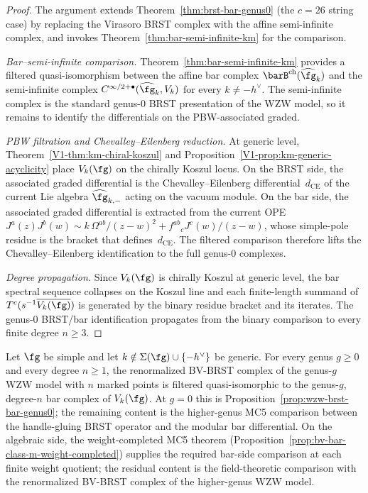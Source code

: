 \begin{proof}
The argument extends
Theorem~\ref{thm:brst-bar-genus0} \textup{(}the $c = 26$ string
case\textup{)} by replacing the Virasoro BRST complex with the
affine semi-infinite complex, and invokes
Theorem~\ref{thm:bar-semi-infinite-km} for the comparison.

\emph{Bar--semi-infinite comparison.}
Theorem~\ref{thm:bar-semi-infinite-km} provides a filtered
quasi-isomorphism between the affine bar complex
$\barB^{\mathrm{ch}}(\widehat{\fg}_k)$ and the semi-infinite complex
$C^{\infty/2+\bullet}(\widehat{\fg}_k, V_k)$ for every
$k \neq -h^\vee$. The semi-infinite complex is the standard
genus-$0$ BRST presentation of the WZW model, so it remains to
identify the differentials on the PBW-associated graded.

\emph{PBW filtration and Chevalley--Eilenberg reduction.}
At generic level, Theorem~\ref{V1-thm:km-chiral-koszul} and
Proposition~\ref{V1-prop:km-generic-acyclicity} place $V_k(\fg)$ on the
chirally Koszul locus. On the BRST side, the associated graded
differential is the Chevalley--Eilenberg differential~$d_{\mathrm{CE}}$
of the current Lie algebra $\widehat{\fg}_{k,-}$ acting on the
vacuum module. On the bar side, the associated graded differential
is extracted from the current OPE
$J^a(z) J^b(w) \sim k\,\Omega^{ab}/(z-w)^2 + f^{ab}{}_c J^c(w)/(z-w)$,
whose simple-pole residue is the bracket that defines~$d_{\mathrm{CE}}$.
The filtered comparison therefore lifts the Chevalley--Eilenberg
identification to the full genus-$0$ complexes.

\emph{Degree propagation.}
Since $V_k(\fg)$ is chirally Koszul at generic level, the bar spectral
sequence collapses on the Koszul line and each finite-length summand of
$T^c(s^{-1}\overline{V_k(\fg)})$ is generated by the binary residue
bracket and its iterates. The genus-$0$ BRST/bar identification
propagates from the binary comparison to every finite degree $n \geq 3$.
\end{proof}

\begin{conjecture}
\label{conj:wzw-brst-bar-all-genera}
Let $\fg$ be simple and let
$k \notin \Sigma(\fg) \cup \{-h^\vee\}$ be generic. For every
genus $g \geq 0$ and every degree $n \geq 1$, the renormalized
BV-BRST complex of the genus-$g$ WZW model with $n$ marked points is
filtered quasi-isomorphic to the genus-$g$, degree-$n$ bar complex of
$V_k(\fg)$. At $g=0$ this is
Proposition~\ref{prop:wzw-brst-bar-genus0}; the remaining content is
the higher-genus MC5 comparison between the handle-gluing BRST
operator and the modular bar differential. On the algebraic side,
the weight-completed MC5 theorem
\textup{(}Proposition~\ref{prop:bv-bar-class-m-weight-completed}\textup{)}
supplies the required bar-side comparison at each finite weight
quotient; the residual content is the
field-theoretic comparison with the renormalized BV-BRST complex of
the higher-genus WZW model.
\end{conjecture}

